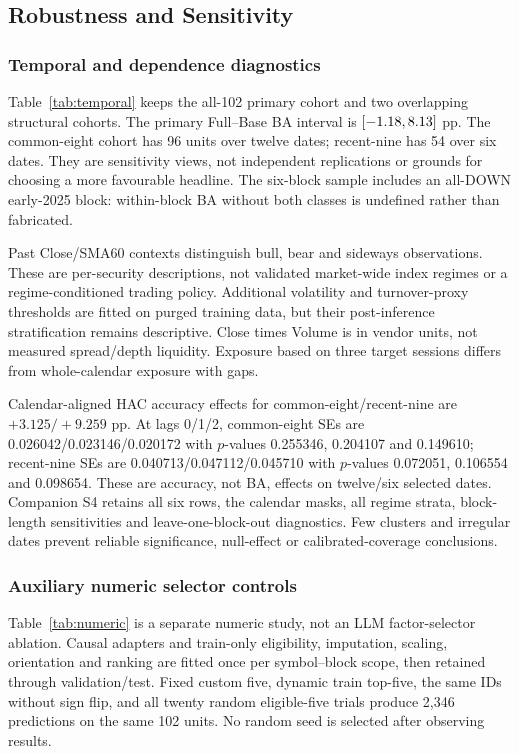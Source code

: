 \subsection{Robustness and Sensitivity}
\subsubsection{Temporal and dependence diagnostics}
Table~\ref{tab:temporal} keeps the all-102 primary cohort and two overlapping structural cohorts. The primary Full--Base BA interval is $[-1.18,8.13]$ pp. The common-eight cohort has 96 units over twelve dates; recent-nine has 54 over six dates. They are sensitivity views, not independent replications or grounds for choosing a more favourable headline. The six-block sample includes an all-DOWN early-2025 block: within-block BA without both classes is undefined rather than fabricated.

Past Close/SMA60 contexts distinguish bull, bear and sideways observations. These are per-security descriptions, not validated market-wide index regimes or a regime-conditioned trading policy. Additional volatility and turnover-proxy thresholds are fitted on purged training data, but their post-inference stratification remains descriptive. Close times Volume is in vendor units, not measured spread/depth liquidity. Exposure based on three target sessions differs from whole-calendar exposure with gaps.

Calendar-aligned HAC accuracy effects for common-eight/recent-nine are $+3.125/+9.259$ pp. At lags 0/1/2, common-eight SEs are 0.026042/0.023146/0.020172 with $p$-values 0.255346, 0.204107 and 0.149610; recent-nine SEs are 0.040713/0.047112/0.045710 with $p$-values 0.072051, 0.106554 and 0.098654. These are accuracy, not BA, effects on twelve/six selected dates. Companion S4 retains all six rows, the calendar masks, all regime strata, block-length sensitivities and leave-one-block-out diagnostics. Few clusters and irregular dates prevent reliable significance, null-effect or calibrated-coverage conclusions.


\subsubsection{Auxiliary numeric selector controls}
Table~\ref{tab:numeric} is a separate numeric study, not an LLM factor-selector ablation. Causal adapters and train-only eligibility, imputation, scaling, orientation and ranking are fitted once per symbol--block scope, then retained through validation/test. Fixed custom five, dynamic train top-five, the same IDs without sign flip, and all twenty random eligible-five trials produce 2,346 predictions on the same 102 units. No random seed is selected after observing results.

